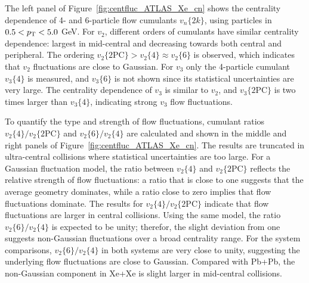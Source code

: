 The left panel of Figure~\ref{fig:centfluc_ATLAS_Xe_cn} shows the centrality dependence of 4- and 6-particle flow cumulants $v_n\{2k\}$, using particles in $0.5<p_\text{T}<5.0$ GeV. For $v_2$, different orders of cumulants have similar centrality dependence: largest in mid-central and decreasing towards both central and peripheral. The ordering $v_2\{\text{2PC}\} > v_2\{4\} \approx v_2\{6\}$ is observed, which indicates that $v_2$ fluctuations are close to Gaussian. For $v_3$ only the 4-particle cumulant $v_3\{4\}$ is measured, and $v_3\{6\}$ is not shown since its statistical uncertainties are very large. The centrality dependence of $v_3$ is similar to $v_2$, and $v_3\{\text{2PC}\}$ is two times larger than $v_3\{4\}$, indicating strong $v_3$ flow fluctuations.

To quantify the type and strength of flow fluctuations, cumulant ratios $v_2\{4\} / v_2\{\text{2PC}\}$ and $v_2\{6\} / v_2\{4\}$ are calculated and shown in the middle and right panels of Figure~\ref{fig:centfluc_ATLAS_Xe_cn}. The results are truncated in ultra-central collisions where statistical uncertainties are too large. For a Gaussian fluctuation model, the ratio between $v_2\{4\}$ and $v_2\{\text{2PC}\}$ reflects the relative strength of flow fluctuations: a ratio that is close to one suggests that the average geometry dominates, while a ratio close to zero implies that flow fluctuations dominate. The results for $v_2\{4\} / v_2\{\text{2PC}\}$ indicate that flow fluctuations are larger in central collisions. Using the same model, the ratio $v_2\{6\} / v_2\{4\}$ is expected to be unity; therefor, the slight deviation from one suggests non-Gaussian fluctuations over a broad centrality range. For the system comparisons, $v_2\{6\} / v_2\{4\}$ in both systems are very close to unity, suggesting the underlying flow fluctuations are close to Gaussian. Compared with Pb+Pb, the non-Gaussian component in Xe+Xe is slight larger in mid-central collisions.

